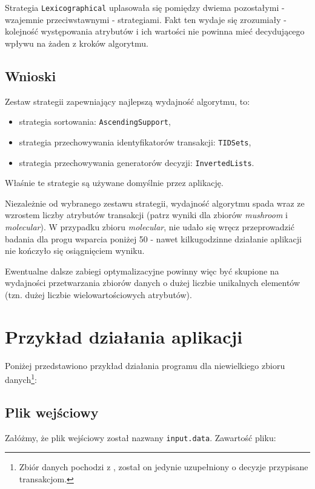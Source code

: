 \documentclass[a4paper,10pt]{article}
\begin{document}
 Strategia \verb+Lexicographical+ uplasowała się pomiędzy dwiema pozostałymi - wzajemnie przeciwstawnymi - strategiami.
 Fakt ten wydaje się zrozumiały - kolejność występowania atrybutów i ich wartości nie powinna mieć decydującego wpływu na żaden z kroków algorytmu.
 
 
 \subsection{Wnioski}
 Zestaw strategii zapewniający najlepszą wydajność algorytmu, to:
 
 \begin{itemize}
  \item strategia sortowania: \verb+AscendingSupport+,
  \item strategia przechowywania identyfikatorów transakcji: \verb+TIDSets+,
  \item strategia przechowywania generatorów decyzji: \verb+InvertedLists+.
 \end{itemize}
 
 Właśnie te strategie są używane domyślnie przez aplikację.

 Niezależnie od wybranego zestawu strategii, wydajność algorytmu spada wraz ze wzrostem liczby atrybutów transakcji (patrz wyniki dla zbiorów \emph{mushroom} i \emph{molecular}).
 W przypadku zbioru \emph{molecular}, nie udało się wręcz przeprowadzić badania dla progu wsparcia poniżej 50 - nawet kilkugodzinne działanie aplikacji nie kończyło się osiągnięciem wyniku.
 
 Ewentualne dalsze zabiegi optymalizacyjne powinny więc być skupione na wydajności przetwarzania zbiorów danych o dużej liczbie unikalnych elementów (tzn. dużej liczbie wielowartościowych atrybutów).
 
 


\section{Przykład działania aplikacji} \label{sec:example}
Poniżej przedstawiono przykład działania programu dla niewielkiego zbioru danych\footnote{Zbiór danych pochodzi z \cite{grm}, został on jedynie uzupełniony o decyzje przypisane transakcjom.}:

 \subsection{Plik wejściowy}
 Załóżmy, że plik wejściowy został nazwany \verb+input.data+.
 Zawartość pliku:
\end{document}
